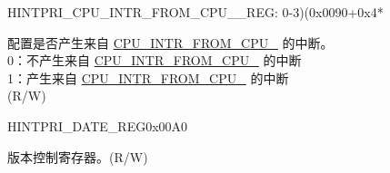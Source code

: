 \begin{register}{H}{INTPRI\_CPU\_INTR\_FROM\_CPU\_\_REG}{: 0-3)(0x0090+0x4*}\label{regdesc:INTPRICPUINTRFROMCPUNREG}
%
%
\regnewline%
\begin{regdesc}\begin{reglist}
\label{fielddesc:INTPRICPUINTRFROMCPUN}\item [INTPRI\_CPU\_INTR\_FROM\_CPU\_\regindex{n}] 配置是否产生来自 \hyperref[CPUINTRFROMCPU0]{CPU\_INTR\_FROM\_CPU\_} 的中断。\\
0：不产生来自 \hyperref[CPUINTRFROMCPU0]{CPU\_INTR\_FROM\_CPU\_} 的中断 \\
1：产生来自 \hyperref[CPUINTRFROMCPU0]{CPU\_INTR\_FROM\_CPU\_} 的中断\\
(R/W)
\end{reglist}\end{regdesc}
\end{register}

\begin{register}{H}{INTPRI\_DATE\_REG}{0x00A0}\label{regdesc:INTPRIDATEREG}
%
%
\regnewline%
\begin{regdesc}\begin{reglist}
\label{fielddesc:INTPRIDATE}\item [INTPRI\_DATE] 版本控制寄存器。(R/W)
\end{reglist}\end{regdesc}
\end{register}

